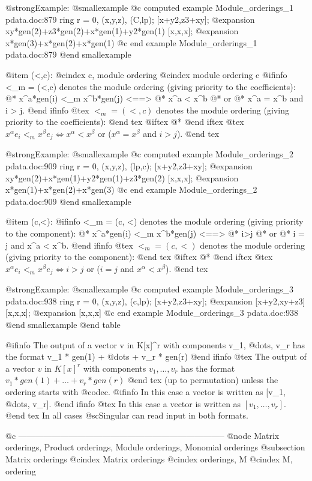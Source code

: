 @strong{Example:}
@smallexample
@c computed example Module_orderings_1 pdata.doc:879 
  ring r = 0, (x,y,z), (C,lp);
  [x+y2,z3+xy];
@expansion{} xy*gen(2)+z3*gen(2)+x*gen(1)+y2*gen(1)
  [x,x,x];
@expansion{} x*gen(3)+x*gen(2)+x*gen(1)
@c end example Module_orderings_1 pdata.doc:879
@end smallexample

@item (<,c):
@cindex c, module ordering
@cindex module ordering c
@ifinfo
<_m = (<,c) denotes the module ordering (giving priority to the coefficients):
@* x^a*gen(i) <_m x^b*gen(j) <==>
@* x^a < x^b
@* or
@* x^a = x^b  and  i > j.
@end ifinfo
@tex
$<_m = (<,c)$ denotes the module ordering (giving priority to the coefficients):
@end tex
@iftex
@*
@end iftex
@tex
\quad \quad $x^\alpha e_i <_m x^\beta e_j \Leftrightarrow x^\alpha <
x^\beta$ or ($x^\alpha = x^\beta $ and $ i > j$).
@end tex

@strong{Example:}
@smallexample
@c computed example Module_orderings_2 pdata.doc:909 
  ring r = 0, (x,y,z), (lp,c);
  [x+y2,z3+xy];
@expansion{} xy*gen(2)+x*gen(1)+y2*gen(1)+z3*gen(2)
  [x,x,x];
@expansion{} x*gen(1)+x*gen(2)+x*gen(3)
@c end example Module_orderings_2 pdata.doc:909
@end smallexample

@item (c,<):
@ifinfo
<_m = (c, <) denotes the module ordering (giving priority to the
component):
@* x^a*gen(i) <_m x^b*gen(j) <==>
@* i>j
@* or
@* i = j and x^a < x^b.
@end ifinfo
@tex
$<_m = (c, <)$ denotes the module ordering (giving priority to the component):
@end tex
@iftex
@*
@end iftex
@tex
\quad \quad   $x^\alpha e_i <_m x^\beta e_j \Leftrightarrow i > j$ or ($
i = j $ and $ x^\alpha < x^\beta $). 
@end tex

@strong{Example:}
@smallexample
@c computed example Module_orderings_3 pdata.doc:938 
  ring r = 0, (x,y,z), (c,lp);
  [x+y2,z3+xy];
@expansion{} [x+y2,xy+z3]
  [x,x,x];
@expansion{} [x,x,x]
@c end example Module_orderings_3 pdata.doc:938
@end smallexample
@end table

@ifinfo
The output of a vector v in K[x]^r with components v_1,
@dots{}, v_r has the format v_1 * gen(1) + @dots{} + v_r * gen(r)
@end ifinfo
@tex
The output of a vector $v$ in $K[x]^r$ with components $v_1,
\ldots, v_r$ has the format $v_1 * gen(1) + \ldots + v_r * gen(r)$
@end tex
(up to permutation) unless the ordering starts with @code{c}.
@ifinfo
In this case a vector is written as [v_1, @dots{}, v_r].
@end ifinfo
@tex
In this case a vector is written as $[v_1, \ldots, v_r]$.
@end tex
In all cases @sc{Singular} can read input in both formats.

@c --------------------------------------------------------------------------
@node Matrix orderings, Product orderings, Module orderings, Monomial orderings
@subsection Matrix orderings
@cindex Matrix orderings
@cindex orderings, M
@cindex M, ordering

